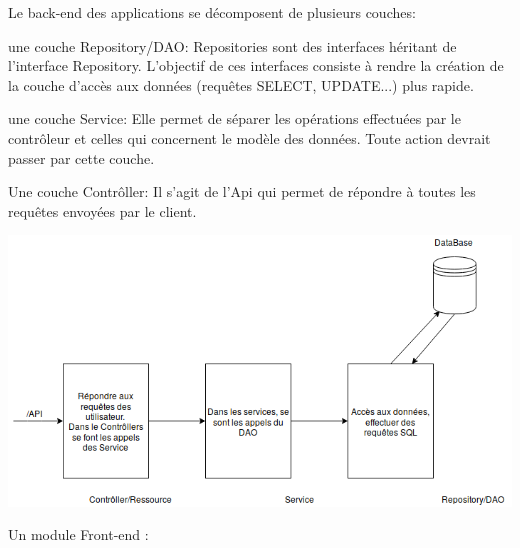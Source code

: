 \documentclass[a4paper]{article}
\begin{document}
Le back-end des applications se décomposent de plusieurs couches: 


une couche Repository/DAO: Repositories sont des interfaces héritant de l'interface Repository. L'objectif de ces interfaces consiste à rendre la création de la couche d'accès aux données (requêtes SELECT, UPDATE...) plus rapide.

une couche Service: Elle permet de séparer les opérations effectuées par le contrôleur et celles qui concernent le modèle des données. Toute action devrait passer par cette couche.

Une couche Contrôller: Il s'agit de l'Api qui permet de répondre à toutes les requêtes envoyées par le client. 

\begin{center}
 \includegraphics[width=1\textwidth]{diagrammes/ArchitectureProjet.png} 
\end{center}
Un module Front-end :
\end{document}
